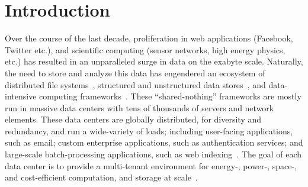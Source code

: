 \documentclass[a4paper,12pt,twoside,openright]{report}
\begin{document}
\pagestyle{empty}
\singlespacing

\onehalfspacing

\singlespacing


\setcounter{page}{0}
\pagestyle{plain}
\tableofcontents
\listoffigures
\listoftables

\onehalfspacing


\chapter{Introduction}
\setcounter{page}{1} 

Over the course of the last decade, proliferation in web applications (Facebook,
Twitter etc.), and scientific computing (sensor networks, high energy physics,
etc.) has resulted in an unparalleled surge in data on the exabyte scale.
Naturally, the need to store and analyze this data has engendered an ecosystem
of distributed file systems~\cite{Ghemawat:2003:GFS}, structured and
unstructured data stores~\cite{Chang:2006:BDS,DeCandia:2007:DAH}, and
data-intensive computing
frameworks~\cite{Dean:2004:MSD,Isard:2007:DDD,Murray:2011:CUE}. These
``shared-nothing'' frameworks are mostly run in massive data centers with tens
of thousands of servers and network elements. These data centers are globally
distributed, for diversity and redundancy, and run a wide-variety of loads;
including user-facing applications, such as email; custom enterprise
applications, such as authentication services; and large-scale batch-processing
applications, such as web indexing~\cite{Benson:2010:NTC}. The goal of each data
center is to provide a multi-tenant environment for energy-, power-, space-, and
cost-efficient computation, and storage at scale~\cite{Katz:2009:TTB}.
\end{document}
